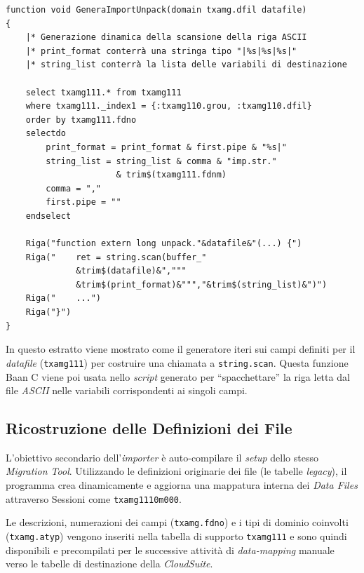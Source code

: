 \begin{listing}[H]
\begin{verbatim}
function void GeneraImportUnpack(domain txamg.dfil datafile)
{
    |* Generazione dinamica della scansione della riga ASCII
    |* print_format conterrà una stringa tipo "|%s|%s|%s|"
    |* string_list conterrà la lista delle variabili di destinazione

    select txamg111.* from txamg111
    where txamg111._index1 = {:txamg110.grou, :txamg110.dfil}
    order by txamg111.fdno
    selectdo
        print_format = print_format & first.pipe & "%s|"
        string_list = string_list & comma & "imp.str."
                      & trim$(txamg111.fdnm)
        comma = ","
        first.pipe = ""
    endselect

    Riga("function extern long unpack."&datafile&"(...) {")
    Riga("    ret = string.scan(buffer_"
              &trim$(datafile)&","""
              &trim$(print_format)&""","&trim$(string_list)&")")
    Riga("    ...")
    Riga("}")
}
\end{verbatim}
\caption{Esempio di generazione del codice per il \textit{parsing} di stringhe \textit{ASCII} (da \texttt{txamgdll0012}).}
\label{lst:parsing_gen}
\end{listing}

In questo estratto viene mostrato come il generatore iteri sui campi definiti per
il \textit{datafile} (\texttt{txamg111}) per costruire una chiamata a \texttt{string.scan}.
Questa funzione Baan C viene poi usata nello \textit{script} generato per \enquote{spacchettare} la riga letta dal file \textit{ASCII} nelle
variabili corrispondenti ai singoli campi.

\subsection{Ricostruzione delle Definizioni dei File}\label{subsec:ricostruzione-delle-definizioni-dei-file}
L'obiettivo secondario dell'\textit{importer} è auto-compilare il \textit{setup} dello stesso \textit{Migration Tool}.
Utilizzando le definizioni originarie dei file (le tabelle \textit{legacy}), il programma crea dinamicamente e aggiorna una
mappatura interna dei \textit{Data Files} attraverso Sessioni come \texttt{txamg1110m000}.

Le descrizioni, numerazioni dei campi (\texttt{txamg.fdno}) e i tipi di dominio coinvolti (\texttt{txamg.atyp}) vengono
inseriti nella tabella di supporto \texttt{txamg111} e sono quindi disponibili e precompilati per le successive attività
di \textit{data-mapping} manuale verso le tabelle di destinazione della \textit{CloudSuite}.

